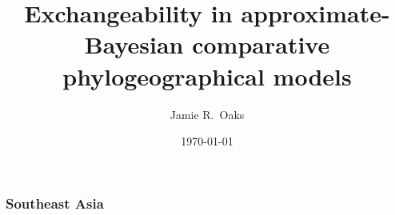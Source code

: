 



\title[Exchangeability in ABC]{Exchangeability in approximate-Bayesian
comparative phylogeographical models}

\author[J.\ Oaks]{
    Jamie R.\ Oaks %
}

\date{\today}


\maketitle




{
\begin{frame}
    \frametitle{Southeast Asia}    
\end{frame}
}


